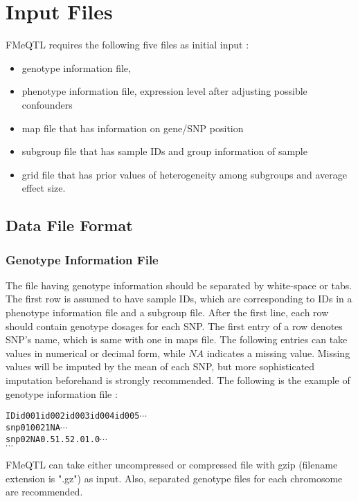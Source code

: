 \documentclass[11pt,fleqn]{article}
\begin{document}
\section{Input Files}
 FMeQTL requires the following five files as initial input :  
\begin{itemize}
 	\item genotype information file, 
 	\item phenotype information file, expression level after adjusting possible confounders
 	\item map file that has information on gene/SNP position
 	\item subgroup file that has sample IDs and group information of sample
 	\item grid file that has prior values of heterogeneity among subgroups and average effect size.
\end{itemize}
\subsection{Data File Format}
\subsubsection{Genotype Information File}
 The file having genotype information should be separated by white-space or tabs. The first row is assumed to have sample IDs, which are corresponding to IDs in a phenotype information file and a subgroup file. After the first line, each row should contain genotype dosages for each SNP. The first entry of a row denotes SNP's name, which is same with one in maps file. The following entries can take values in numerical or decimal form, while $NA$ indicates a missing value. Missing values will be imputed by the mean of each SNP, but more sophisticated imputation beforehand is strongly recommended.
 The following is the example of genotype information file :
 \begin{alltt}
	ID id001 id002 id003 id004 id005 \(\cdots\)
	snp01 0 0 2 1 NA  \(\cdots\)
	snp02 NA 0.5 1.5 2.0 1.0  \(\cdots\)
	\(\cdots\)
 \end{alltt}
 FMeQTL can take either uncompressed or compressed file with gzip (filename extension is ".gz") as input. Also, separated genotype files for each chromosome are recommended. 
\end{document}
